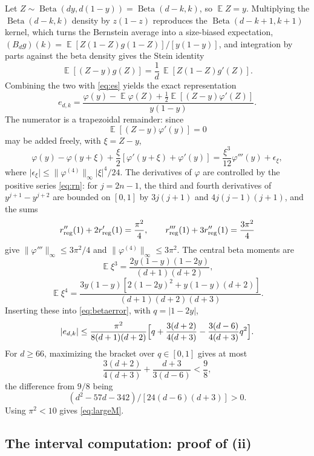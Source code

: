 \documentclass[aps,prl,reprint,superscriptaddress,longbibliography,floatfix,raggedbottom]{revtex4-2}
\newcommand{\norm}[1]{\lVert #1\rVert}
\newcommand{\abs}[1]{\lvert #1\rvert}
\DeclareMathOperator{\Beta}{Beta}
\DeclareMathOperator{\Ex}{\mathbb E}
\begin{document}
Let $Z\sim\Beta(dy,d(1-y))=\Beta(d-k,k)$, so $\Ex Z=y$. Multiplying the
$\Beta(d-k,k)$ density by $z(1-z)$ reproduces the $\Beta(d-k+1,k+1)$
kernel, which turns the Bernstein average into a size-biased
expectation,
$(B_dg)(k)=\mbox{$\Ex[Z(1-Z)g(1-Z)]/[y(1-y)]$}$, and integration by parts against
the beta density gives the Stein identity
\cite{GoldsteinReinert,Dobler}
\[
\Ex[(Z-y)g(Z)]=\frac1d\,\Ex[Z(1-Z)g'(Z)].
\]
Combining the two with \eqref{eq:es} yields the exact representation
\begin{equation}\label{eq:betaerror}
e_{d,k}=\frac{\varphi(y)-\Ex\varphi(Z)
+\tfrac12\Ex[(Z-y)\varphi'(Z)]}{y(1-y)} .
\end{equation}
The numerator is a trapezoidal remainder: since
\[
\Ex[(Z-y)\varphi'(y)]=0
\]
may be added freely, with $\xi=Z-y$,
\[
\varphi(y)-\varphi(y+\xi)
+\frac\xi2[\varphi'(y+\xi)+\varphi'(y)]
=\frac{\xi^3}{12}\varphi'''(y)+\epsilon_\xi,
\]
where
$\abs{\epsilon_\xi}\le\norm{\varphi^{(4)}}_\infty\abs\xi^4/24$.
The derivatives of $\varphi$ are controlled by the positive series
\eqref{eq:rn}: for $j=2n-1$, the third and fourth derivatives of
$y^{j+1}-y^{j+2}$ are bounded on $[0,1]$ by $3j(j+1)$ and
$4j(j-1)(j+1)$, and the sums
\[
r_{\rm reg}''(1)+2r_{\rm reg}'(1)=\frac{\pi^2}4,\qquad
r_{\rm reg}'''(1)+3r_{\rm reg}''(1)=\frac{3\pi^2}4
\]
give $\norm{\varphi'''}_\infty\le3\pi^2/4$ and
$\norm{\varphi^{(4)}}_\infty\le3\pi^2$. The central beta moments are
\[
\Ex\xi^3=\frac{2y(1-y)(1-2y)}{(d+1)(d+2)},
\]
\[
\Ex\xi^4=\frac{3y(1-y)[2(1-2y)^2+y(1-y)(d+2)]}{(d+1)(d+2)(d+3)}.
\]
Inserting these into \eqref{eq:betaerror}, with $q=\abs{1-2y}$,
\[
\abs{e_{d,k}}\le\frac{\pi^2}{8(d+1)(d+2)}
\Bigl[q+\frac{3(d+2)}{4(d+3)}
-\frac{3(d-6)}{4(d+3)}q^2\Bigr].
\]
For $d\ge66$, maximizing the bracket over $q\in[0,1]$ gives at most
\[
\frac{3(d+2)}{4(d+3)}+\frac{d+3}{3(d-6)}<\frac98,
\]
the difference from $9/8$ being
\[
(d^2-57d-342)/[24(d-6)(d+3)]>0.
\]
Using $\pi^2<10$ gives
\eqref{eq:largeM}.

\subsection{The interval computation: proof of (ii)}
\end{document}
